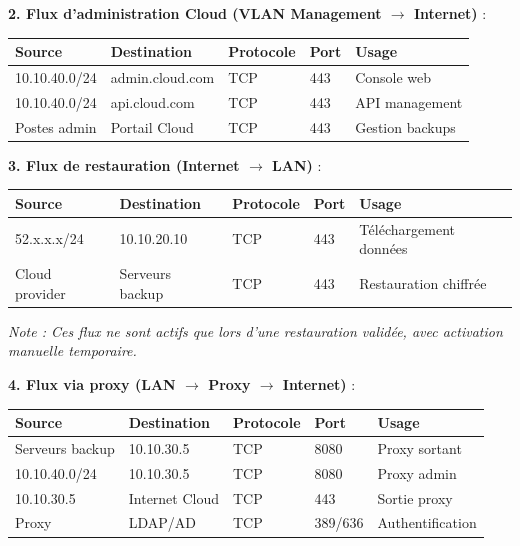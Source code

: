 \newpage

\noindent \textbf{2. Flux d'administration Cloud (VLAN Management $\rightarrow$ Internet)} :\\

\vspace{0.5cm}

\begin{tabular}{|l|l|l|l|l|}
\hline
\textbf{Source} & \textbf{Destination} & \textbf{Protocole} & \textbf{Port} & \textbf{Usage} \\ \hline
10.10.40.0/24 & admin.cloud.com & TCP & 443 & Console web \\ \hline
10.10.40.0/24 & api.cloud.com & TCP & 443 & API management \\ \hline
Postes admin & Portail Cloud & TCP & 443 & Gestion backups \\ \hline
\end{tabular}

\medskip

\noindent \textbf{3. Flux de restauration (Internet $\rightarrow$ LAN)} :\\

\vspace{0.5cm}

\begin{tabular}{|l|l|l|l|l|}
\hline
\textbf{Source} & \textbf{Destination} & \textbf{Protocole} & \textbf{Port} & \textbf{Usage} \\ \hline
52.x.x.x/24 & 10.10.20.10 & TCP & 443 & Téléchargement données \\ \hline
Cloud provider & Serveurs backup & TCP & 443 & Restauration chiffrée \\ \hline
\end{tabular}

\noindent \textit{Note : Ces flux ne sont actifs que lors d'une restauration validée, avec activation manuelle temporaire.}

\medskip

\noindent \textbf{4. Flux via proxy (LAN $\rightarrow$ Proxy $\rightarrow$ Internet)} :\\

\vspace{0.5cm}

\begin{tabular}{|l|l|l|l|l|}
\hline
\textbf{Source} & \textbf{Destination} & \textbf{Protocole} & \textbf{Port} & \textbf{Usage} \\ \hline
Serveurs backup & 10.10.30.5 & TCP & 8080 & Proxy sortant \\ \hline
10.10.40.0/24 & 10.10.30.5 & TCP & 8080 & Proxy admin \\ \hline
10.10.30.5 & Internet Cloud & TCP & 443 & Sortie proxy \\ \hline
Proxy & LDAP/AD & TCP & 389/636 & Authentification \\ \hline
\end{tabular}

